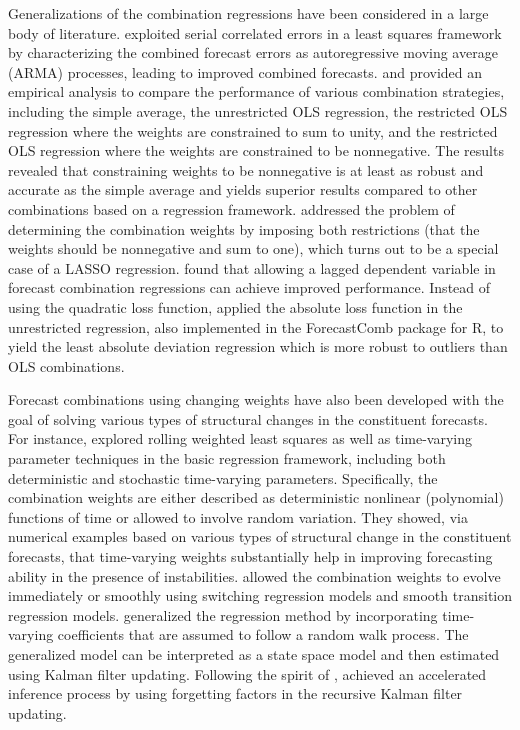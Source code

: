 \documentclass[a4paper,11pt]{article}
\newcommand{\pkg}[1]{{\normalfont\fontseries{b}\selectfont #1}}
\let\proglang=\textsf
\begin{document}
Generalizations of the combination regressions have been considered in a large body of literature. \citet{Diebold1988-sx} exploited serial correlated errors in a least squares framework by characterizing the combined forecast errors as autoregressive moving average (ARMA) processes, leading to improved combined forecasts. \citet{Gunter1992-go} and \citet{Aksu1992-lb} provided an empirical analysis to compare the performance of various combination strategies, including the simple average, the unrestricted OLS regression, the restricted OLS regression where the weights are constrained to sum to unity, and the restricted OLS regression where the weights are constrained to be nonnegative. The results revealed that constraining weights to be nonnegative is at least as robust and accurate as the simple average and yields superior results compared to other combinations based on a regression framework. \citet{Conflitti2015-fq} addressed the problem of determining the combination weights by imposing both restrictions (that the weights should be nonnegative and sum to one), which turns out to be a special case of a LASSO regression. \citet{Edward_Coulson1993-db} found that allowing a lagged dependent variable in forecast combination regressions can achieve improved performance. Instead of using the quadratic loss function, \citet{Nowotarski2014-ev} applied the absolute loss function in the unrestricted regression, also implemented in the \pkg{ForecastComb} package for \proglang{R}, to yield the least absolute deviation regression which is more robust to outliers than OLS combinations.

Forecast combinations using changing weights have also been developed with the goal of solving various types of structural changes in the constituent forecasts. For instance, \citet{Diebold1987-go} explored rolling weighted least squares as well as time-varying parameter techniques in the basic regression framework, including both deterministic and stochastic time-varying parameters. Specifically, the combination weights are either described as deterministic nonlinear (polynomial) functions of time or allowed to involve random variation. They showed, via numerical examples based on various types of structural change in the constituent forecasts, that time-varying weights substantially help in improving forecasting ability in the presence of instabilities. \citet{Deutsch1994-ob} allowed the combination weights to evolve immediately or smoothly using switching regression models and smooth transition regression models. \citet{Terui2002-df} generalized the regression method by incorporating time-varying coefficients that are assumed to follow a random walk process. The generalized model can be interpreted as a state space model and then estimated using Kalman filter updating. Following the spirit of \citet{Terui2002-df}, \citet{Raftery2010-qe} achieved an accelerated inference process by using forgetting factors in the recursive Kalman filter updating.
\end{document}
